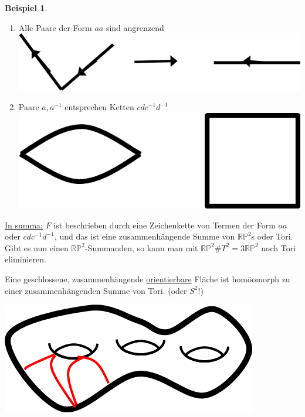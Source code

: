 \documentclass[a4paper,11pt,notitlepage]{report}
\theoremstyle{definition}
\newtheorem{example}{Beispiel}[chapter]
\newcommand{\R}{{\ensuremath{\mathbb{R}}}}
\newcommand{\Prim}{{\ensuremath{\mathbb{P}}}}
\begin{document}
\begin{example}
\begin{enumerate}
		\item Alle Paare der Form $aa$ sind angrenzend \newline
		\includegraphics[scale=0.5]{images/2012_01_12_Bild4c.png}
		\item Paare $a,a^{-1}$ entsprechen Ketten $cdc^{-1}d^{-1}$ \newline
		\includegraphics[scale=0.5]{images/2012_01_12_Bild4d.png}
	\end{enumerate}
	\underline{In summa:} $F$ ist beschrieben durch eine Zeichenkette von Termen der Form $aa$ oder $cdc^{-1}d^{-1}$, und das ist eine zusammenhängende Summe von $\R \Prim^2$s oder Tori.
	\newline
	Gibt es nun einen $\R \Prim^2$-Summanden, so kann man mit $\R \Prim^2 \# T^2 = 3 \R \Prim^2$ noch Tori eliminieren.	
\end{example}

\begin{corollary}
	Eine geschlossene, zusammenhängende \underline{orientierbare} Fläche ist homöomorph zu einer zusammenhängenden Summe von Tori. (oder $S^2$!)
	\begin{center}
		\includegraphics[scale=0.5]{images/2012_01_12_Bild5.png}
	\end{center}
\end{corollary}
\end{document}

